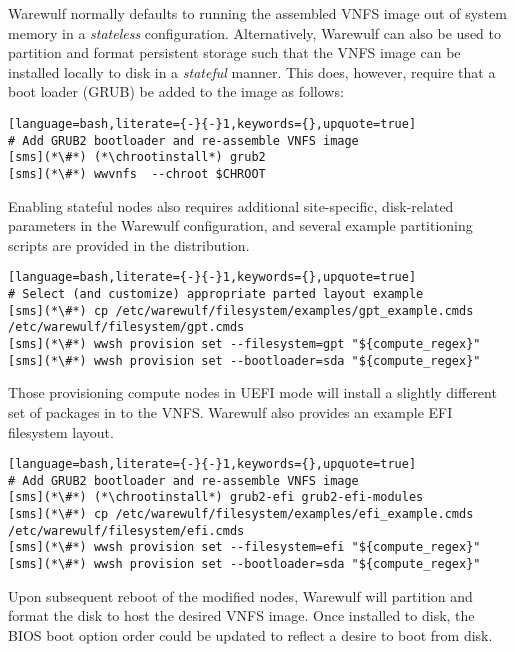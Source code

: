 Warewulf normally defaults to running the assembled VNFS image out of system
memory in a {\em stateless} configuration. Alternatively, Warewulf can also be
used to partition and format persistent storage such that the VNFS image can be
installed locally to disk in a {\em stateful} manner.  This does, however,
require that a boot loader (GRUB) be added to the image as follows:

\begin{lstlisting}[language=bash,literate={-}{-}1,keywords={},upquote=true]
# Add GRUB2 bootloader and re-assemble VNFS image
[sms](*\#*) (*\chrootinstall*) grub2
[sms](*\#*) wwvnfs  --chroot $CHROOT
\end{lstlisting}

\noindent Enabling stateful nodes also requires additional site-specific, disk-related
parameters in the Warewulf configuration, and several example partitioning scripts are 
provided in the distribution. 

\begin{lstlisting}[language=bash,literate={-}{-}1,keywords={},upquote=true]
# Select (and customize) appropriate parted layout example
[sms](*\#*) cp /etc/warewulf/filesystem/examples/gpt_example.cmds /etc/warewulf/filesystem/gpt.cmds
[sms](*\#*) wwsh provision set --filesystem=gpt "${compute_regex}" 
[sms](*\#*) wwsh provision set --bootloader=sda "${compute_regex}" 
\end{lstlisting}

\begin{center}
\begin{tcolorbox}[]
\small
Those provisioning compute nodes in UEFI mode will install a slightly different
set of packages in to the VNFS. Warewulf also provides an example EFI filesystem
layout.
\begin{lstlisting}[language=bash,literate={-}{-}1,keywords={},upquote=true]
# Add GRUB2 bootloader and re-assemble VNFS image
[sms](*\#*) (*\chrootinstall*) grub2-efi grub2-efi-modules
[sms](*\#*) cp /etc/warewulf/filesystem/examples/efi_example.cmds /etc/warewulf/filesystem/efi.cmds
[sms](*\#*) wwsh provision set --filesystem=efi "${compute_regex}" 
[sms](*\#*) wwsh provision set --bootloader=sda "${compute_regex}" 
\end{lstlisting}
\end{tcolorbox}
\end{center}

\noindent Upon subsequent reboot of the modified nodes, Warewulf will partition
and format the disk to host the desired VNFS image.  Once installed to disk,
the BIOS boot option order could be updated to reflect a desire
to boot from disk.
